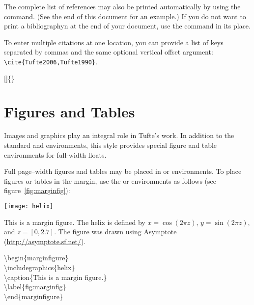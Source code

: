The complete list of references may also be printed automatically by using
the  command.  (See the end of this document for an
example.)  If you do not want to print a bibliographyn at the end of your
document, use the  command in its place.  

To enter multiple citations at one location,\cite[-3\baselineskip]{Tufte2006,Tufte1990} you can
provide a list of keys separated by commas and the same optional vertical
offset argument: \Verb|\cite{Tufte2006,Tufte1990}|.  
\begin{docspec}
  []\{\}
\end{docspec}

\section{Figures and Tables}\label{sec:figures-and-tables}
Images and graphics play an integral role in Tufte's work.
In addition to the standard  and  environments,
this style provides special figure and table environments for full-width
floats.

Full page--width figures and tables may be placed in  or
 environments.  To place figures or tables in the margin,
use the  or  environments as follows
(see figure~\ref{fig:marginfig}):

\begin{marginfigure}%
  \texttt{[image: helix]}
  \caption{This is a margin figure.  The helix is defined by 
    $x = \cos(2\pi z)$, $y = \sin(2\pi z)$, and $z = [0, 2.7]$.  The figure was
    drawn using Asymptote (\protect\url{http://asymptote.sf.net/}).}
  \label{fig:marginfig}
\end{marginfigure}

\begin{docspec}
\textbackslash begin\{marginfigure\}\\
  \qquad\textbackslash includegraphics\{helix\}\\
  \qquad\textbackslash caption\{This is a margin figure.\}\\
  \qquad\textbackslash label\{fig:marginfig\}\\
\textbackslash end\{marginfigure\}\\
\end{docspec}

